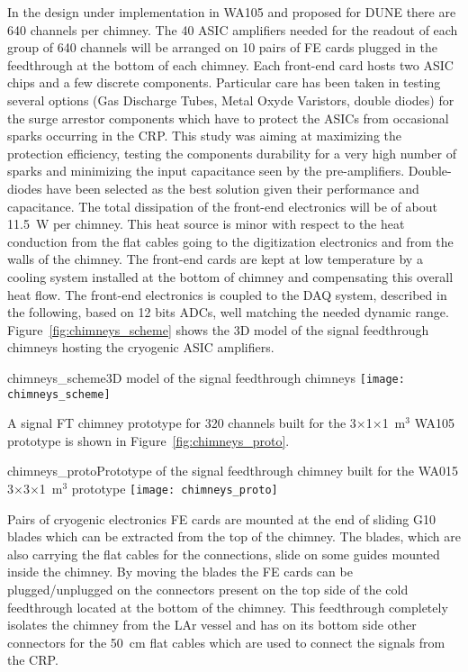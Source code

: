 In the design under implementation in WA105 and proposed for DUNE
there are 640 channels per chimney. The 40 ASIC amplifiers needed for
the readout of each group of 640 channels will be arranged on 10 pairs
of FE cards plugged in the feedthrough at the bottom of each chimney.
Each front-end card hosts two ASIC chips and a few discrete
components. Particular care has been taken in testing several options
(Gas Discharge Tubes, Metal Oxyde Varistors, double diodes) for the
surge arrestor components which have to protect the ASICs from
occasional sparks occurring in the CRP.  This study was aiming at
maximizing the protection efficiency, testing the components
durability for a very high number of sparks and minimizing the input
capacitance seen by the pre-amplifiers. Double-diodes have been
selected as the best solution given their performance and
capacitance. The total dissipation of the front-end electronics will
be of about 11.5~W per chimney. This heat source is minor with respect
to the heat conduction from the flat cables going to the digitization
electronics and from the walls of the chimney. The front-end cards are
kept at low temperature by a cooling system installed at the bottom of
chimney and compensating this overall heat flow. The front-end
electronics is coupled to the DAQ system, described in the following,
based on 12 bits ADCs, well matching the needed dynamic
range. Figure~\ref{fig:chimneys_scheme} shows the 3D model of the
signal feedthrough chimneys hosting the cryogenic ASIC amplifiers.
\begin{cdrfigure}
{chimneys_scheme}{3D model of the signal feedthrough chimneys}
\texttt{[image: chimneys\_scheme]}
\end{cdrfigure}

A signal FT chimney prototype for 320 channels built for the
3$\times$1$\times$1~m$^3$ WA105 prototype is shown in
Figure~\ref{fig:chimneys_proto}.
\begin{cdrfigure}
{chimneys_proto}{Prototype of the signal feedthrough chimney built 
for the WA015 3$\times$3$\times$1~m$^3$ prototype}
\texttt{[image: chimneys\_proto]}
\end{cdrfigure}

Pairs of cryogenic electronics FE cards are mounted at the end of
sliding G10 blades which can be extracted from the top of the
chimney. The blades, which are also carrying the flat cables for the
connections, slide on some guides mounted inside the chimney. By
moving the blades the FE cards can be plugged/unplugged on the
connectors present on the top side of the cold feedthrough located at
the bottom of the chimney. This feedthrough completely isolates the
chimney from the LAr vessel and has on its bottom side other
connectors for the 50~cm flat cables which are used to connect the
signals from the CRP.

